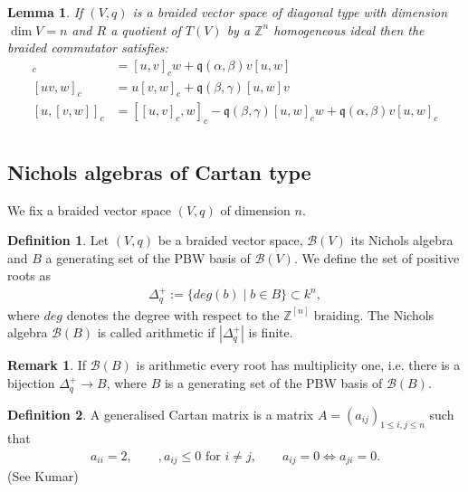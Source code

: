 \documentclass{amsart}
\newtheorem{lemma}{Lemma}
\theoremstyle{definition}
\newtheorem{definition}{Definition}
\newtheorem*{remark}{Remark}
\newcommand{\Nichols}[1]{\ensuremath{\mathcal{B}(#1)}}
\begin{document}
	\begin{lemma}
		If $(V,q)$ is a braided vector space of diagonal type with dimension $\dim V =n$ and $R$ a quotient of $T(V)$ by a $\mathbb Z^{n}$ homogeneous ideal then the braided commutator satisfies:
		\begin{align}
			[u,vw]_c & = [u,v]_c w + \mathfrak{q}(\alpha, \beta) v[u,w] \\	
			[uv,w]_c & = u[v,w]_c + \mathfrak{q}(\beta, \gamma) [u,w]v \\
			[u,[v,w]]_c & = [[u,v]_c , w]_c  - \mathfrak q (\beta, \gamma) [u, w]_c w + \mathfrak q (\alpha, \beta) v [u, w]_c\\ 
		\end{align}
	\end{lemma}

	\subsection{Nichols algebras of Cartan type}
	
	We fix a braided vector space $(V,q)$ of dimension $n$.
	
	\begin{definition}
		Let $(V,q)$ be a braided vector space, $\Nichols V$ its Nichols algebra and $B$ a generating set of the  PBW basis of $\Nichols V$.
		We define the set of positive roots as
		\begin{align}
			\Delta^+_q := \{deg(b) \mid b \in B \} \subset k^n,
		\end{align}
		where $deg$ denotes the degree with respect to the $\mathbb Z^{[n]}$ braiding.
		The Nichols algebra $\Nichols B$ is called arithmetic if $|\Delta^+_q|$ is finite.
	\end{definition}

	\begin{remark}
		If $\Nichols B$ is arithmetic every root has multiplicity one, i.e.
		there is a bijection $\Delta^+_q \rightarrow B$, where $B$ is a generating set of the PBW basis of $\Nichols B$.
	\end{remark}
	
	\begin{definition}
		A generalised Cartan matrix is a matrix $A= (a_{ij})_{1\leq i,j \leq n}$ such that
		\begin{gather}
			a_{ii}=2, \qquad, a_{ij}\leq 0 \text{ for } i \neq j, \qquad a_{ij}=0 \Leftrightarrow a_{ji}=0.			
		\end{gather}
		(See Kumar)
	\end{definition}
	
\end{document}
